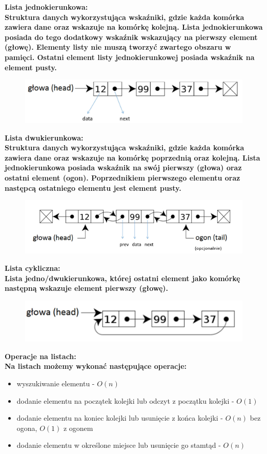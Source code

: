 \documentclass[a4paper,12pt]{article}
\newcommand{\h}[1]{\noindent \bf #1 \rm \\ \noindent}
\begin{document}
\h{Lista jednokierunkowa:}
Struktura danych wykorzystująca wskaźniki, gdzie każda komórka zawiera dane oraz wskazuje na komórkę kolejną. Lista jednokierunkowa posiada do tego dodatkowy wskaźnik wskazujący na pierwszy element (głowę). Elementy listy nie muszą tworzyć zwartego obszaru w pamięci. Ostatni element listy jednokierunkowej posiada wskaźnik na element pusty.

\begin{figure}[H]
	\centering
	\includegraphics[width=14cm]{lista_jednokier.png}
\end{figure}

\h{Lista dwukierunkowa:}
Struktura danych wykorzystująca wskaźniki, gdzie każda komórka zawiera dane oraz wskazuje na komórkę poprzednią oraz kolejną. Lista jednokierunkowa posiada wskaźnik na swój pierwszy (głowa) oraz ostatni element (ogon). Poprzednikiem pierwszego elementu oraz następcą ostatniego elementu jest element pusty.

\begin{figure}[H]
	\centering
	\includegraphics[width=14cm]{lista_dwukier.png}
\end{figure}

\h{Lista cykliczna:}
Lista jedno/dwukierunkowa, której ostatni element jako komórkę następną wskazuje element pierwszy (głowę).
\begin{figure}[H]
	\centering
	\includegraphics[width=14cm]{lista-cykl.png}
\end{figure}

\h{Operacje na listach:}
Na listach możemy wykonać następujące operacje:
\begin{itemize}
	\item wyszukiwanie elementu  - $O(n)$
	\item dodanie elementu na początek kolejki lub odczyt z początku kolejki - $O(1)$
	\item dodanie elementu na koniec kolejki lub usunięcie z końca kolejki - $O(n)$ bez ogona, $O(1)$ z ogonem
	\item dodanie elementu w określone miejsce lub usunięcie go stamtąd - $O(n)$
\end{itemize}
\end{document}
